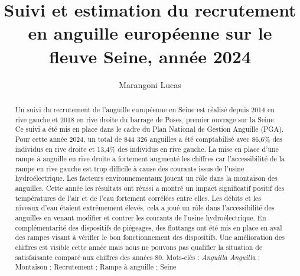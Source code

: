 \documentclass[11pt,titlepage,twoside]{article}\usepackage[]{graphicx}\usepackage[table]{xcolor}
\title{Suivi et estimation du recrutement en anguille européenne sur le fleuve Seine,
année 2024}
\author[1]{Marangoni Lucas}
\affil[1]{Seine-Normandie Migrateurs, 11 cours Clemenceau 76100 Rouen}
\begin{document}
\hypersetup{pageanchor=false}

\begin{titlepage}



\end{titlepage}



\newpage
\thispagestyle{empty}
\strut
\newpage

 \setcounter{page}{1}

\maketitle

\begin{abstract}

Un suivi du recrutement de l’anguille européenne en Seine est réalisé depuis 2014 en rive gauche et 2018 en rive droite du barrage de Poses, premier ouvrage sur la Seine. Ce suivi a été mis en place dans le cadre du Plan National de Gestion Anguille (PGA). Pour cette année 2024, un total de 844 326 anguilles a été comptabilisé avec 86,6\% des individus en rive droite et 13,4\% des individus en rive gauche. La mise en place d’une rampe à anguille en rive droite a fortement augmenté les chiffres car l’accessibilité de la rampe en rive gauche est trop difficile à cause des courants issus de l’usine hydroélectrique. Les facteurs environnementaux jouent un rôle dans la montaison des anguilles. Cette année les résultats ont réussi a montré un impact significatif positif des températures de l’air et de l’eau fortement corrélées entre elles. Les débits et les niveaux d’eau étaient extrêmement élevés, cela a joué un rôle dans l’accessibilité des anguilles en venant modifier et contrer les courants de l’usine hydroélectrique. En complémentarité des dispositifs de piégeages, des flottangs ont été mis en place en aval des rampes visant à vérifier le bon fonctionnement des dispositifs. Une amélioration des chiffres est visible cette année mais nous ne pouvons pas qualifier la situation de satisfaisante comparé aux chiffres des années 80.
Mots-clés :  \textit{Anguilla Anguilla} ; Montaison ; Recrutement ; Rampe à anguille ; Seine


\end{abstract}

\newpage

\tableofcontents

\clearpage
\end{document}
